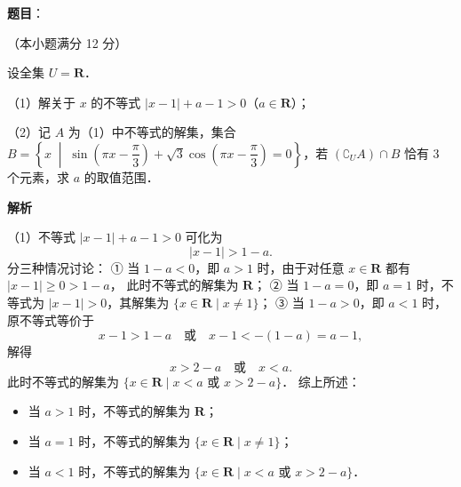\begin{answer}

\textbf{题目}：

（本小题满分 12 分）

设全集 $U = \mathbf{R}$．

（1）解关于 $x$ 的不等式 $|x - 1| + a - 1 > 0$（$a \in \mathbf{R}$）；

（2）记 $A$ 为（1）中不等式的解集，集合 $B = \left\{x \;\middle|\; \sin\left(\pi x - \dfrac{\pi}{3}\right) + \sqrt{3}\cos\left(\pi x - \dfrac{\pi}{3}\right) = 0\right\}$，若 $(\complement_U A) \cap B$ 恰有 3 个元素，求 $a$ 的取值范围．

\textbf{解析}

（1）不等式 $|x - 1| + a - 1 > 0$ 可化为
\nopagebreak[4]
\[
|x - 1| > 1 - a.
\]
分三种情况讨论：
① 当 $1 - a < 0$，即 $a > 1$ 时，由于对任意 $x \in \mathbf{R}$ 都有 $|x - 1| \geqslant 0 > 1 - a$，
此时不等式的解集为 $\mathbf{R}$；
② 当 $1 - a = 0$，即 $a = 1$ 时，不等式为 $|x - 1| > 0$，其解集为 $\{x \in \mathbf{R} \mid x \neq 1\}$；
③ 当 $1 - a > 0$，即 $a < 1$ 时，原不等式等价于
\nopagebreak[4]
\[
x - 1 > 1 - a \quad \text{或} \quad x - 1 < -(1 - a) = a - 1,
\]
解得
\nopagebreak[4]
\[
x > 2 - a \quad \text{或} \quad x < a.
\]
此时不等式的解集为 $\{x \in \mathbf{R} \mid x < a$ 或 $x > 2 - a\}$．
综上所述：
\begin{itemize}
\item 当 $a > 1$ 时，不等式的解集为 $\mathbf{R}$；
\item 当 $a = 1$ 时，不等式的解集为 $\{x \in \mathbf{R} \mid x \neq 1\}$；
\item 当 $a < 1$ 时，不等式的解集为 $\{x \in \mathbf{R} \mid x < a$ 或 $x > 2 - a\}$．
\end{itemize}


\end{answer}
